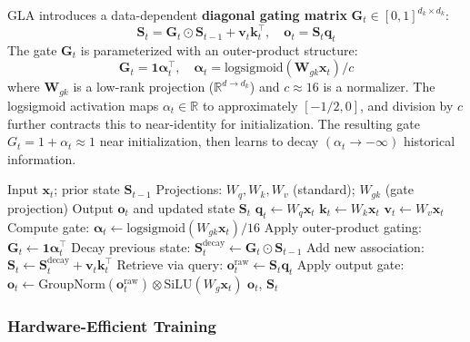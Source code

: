 \documentclass[11pt,a4paper]{article}
\begin{document}
GLA introduces a data-dependent \textbf{diagonal gating matrix} $\mathbf{G}_t \in [0,1]^{d_k \times d_k}$:
\[
\mathbf{S}_t = \mathbf{G}_t \odot \mathbf{S}_{t-1} + \mathbf{v}_t \mathbf{k}_t^\top, \quad \mathbf{o}_t = \mathbf{S}_t \mathbf{q}_t
\]
The gate $\mathbf{G}_t$ is parameterized with an outer-product structure:
\[
\mathbf{G}_t = \mathbf{1} \boldsymbol{\alpha}_t^\top, \quad \boldsymbol{\alpha}_t = \text{logsigmoid}\left(\mathbf{W}_{gk} \mathbf{x}_t\right) / c
\]
where $\mathbf{W}_{gk}$ is a low-rank projection ($\mathbb{R}^{d \to d_k}$) and $c \approx 16$ is a normalizer. The logsigmoid activation maps $\alpha_t \in \mathbb{R}$ to approximately $[-1/2, 0]$, and division by $c$ further contracts this to near-identity for initialization. The resulting gate $G_t = 1 + \alpha_t \approx 1$ near initialization, then learns to decay $(\alpha_t \to -\infty)$ historical information.

\begin{algorithm}[H]
\caption{Gated Linear Attention (Recurrent Form)}
\begin{algorithmic}[1]
\Require Input $\mathbf{x}_t$; prior state $\mathbf{S}_{t-1}$
\Require Projections: $W_q, W_k, W_v$ (standard); $W_{gk}$ (gate projection)
\Ensure Output $\mathbf{o}_t$ and updated state $\mathbf{S}_t$
\State $\mathbf{q}_t \gets W_q \mathbf{x}_t$
\State $\mathbf{k}_t \gets W_k \mathbf{x}_t$
\State $\mathbf{v}_t \gets W_v \mathbf{x}_t$
\State Compute gate: $\boldsymbol{\alpha}_t \gets \text{logsigmoid}(W_{gk} \mathbf{x}_t) / 16$ 
\State Apply outer-product gating: $\mathbf{G}_t \gets \mathbf{1} \boldsymbol{\alpha}_t^\top$  
\State Decay previous state: $\mathbf{S}_t^\text{decay} \gets \mathbf{G}_t \odot \mathbf{S}_{t-1}$ 
\State Add new association: $\mathbf{S}_t \gets \mathbf{S}_t^\text{decay} + \mathbf{v}_t \mathbf{k}_t^\top$
\State Retrieve via query: $\mathbf{o}_t^\text{raw} \gets \mathbf{S}_t \mathbf{q}_t$
\State Apply output gate: $\mathbf{o}_t \gets \text{GroupNorm}(\mathbf{o}_t^\text{raw}) \otimes \text{SiLU}(W_g \mathbf{x}_t)$
\Return $\mathbf{o}_t$, $\mathbf{S}_t$
\end{algorithmic}
\end{algorithm}

\subsubsection{Hardware-Efficient Training}
\end{document}
